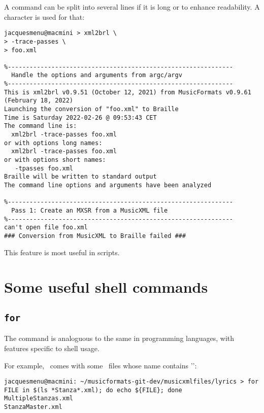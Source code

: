 A command can be split into several lines if it is long or to enhance readability. A \code{\textbackslash} character is used for that:
\begin{lstlisting}[language=Terminal]
jacquesmenu@macmini > xml2brl \
> -trace-passes \
> foo.xml

%--------------------------------------------------------------
  Handle the options and arguments from argc/argv
%--------------------------------------------------------------
This is xml2brl v0.9.51 (October 12, 2021) from MusicFormats v0.9.61 (February 18, 2022)
Launching the conversion of "foo.xml" to Braille
Time is Saturday 2022-02-26 @ 09:53:43 CET
The command line is:
  xml2brl -trace-passes foo.xml
or with options long names:
  xml2brl -trace-passes foo.xml
or with options short names:
   -tpasses foo.xml
Braille will be written to standard output
The command line options and arguments have been analyzed

%--------------------------------------------------------------
  Pass 1: Create an MXSR from a MusicXML file
%--------------------------------------------------------------
can't open file foo.xml
### Conversion from MusicXML to Braille failed ###
\end{lstlisting}

This feature is most useful in scripts.


\section{Some useful shell commands}

\subsection{{\tt for}}

The \code{for} command is analoguous to the same in programming languages, with features specific to shell usage.

For example, \mf\ comes with some \mxml\ files whose name contains '\code{Stanza}':
\begin{lstlisting}[language=Terminal]
jacquesmenu@macmini: ~/musicformats-git-dev/musicxmlfiles/lyrics > for FILE in $(ls *Stanza*.xml); do echo ${FILE}; done
MultipleStanzas.xml
StanzaMaster.xml
\end{lstlisting}

